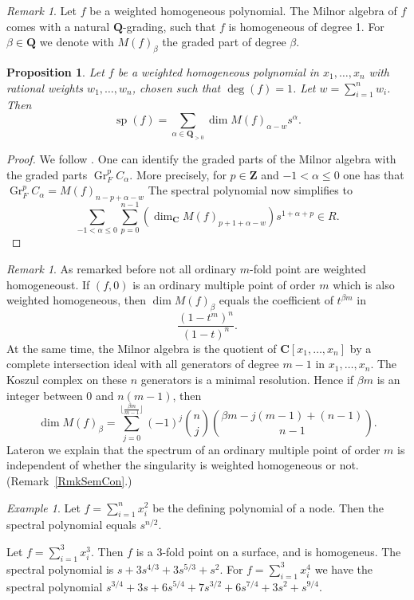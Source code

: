 \documentclass{amsart}
\newcommand{\C}{\mathbf{C}}
\newcommand{\Q}{\mathbf{Q}}
\newcommand{\Z}{\mathbf{Z}}
\newtheorem{proposition}[lemma]{Proposition}
\theoremstyle{definition}
\theoremstyle{remark}
\newtheorem{remark}[lemma]{Remark}
\newtheorem{example}[lemma]{Example}
\DeclareMathOperator{\Gr}{Gr}
\DeclareMathOperator{\spe}{sp}
\begin{document}
\begin{remark}
Let $f$ be a weighted homogeneous polynomial. The Milnor algebra of $f$ comes with a natural $\Q$-grading,  such that $f$ is homogeneous of degree 1.  For $\beta\in \Q$ we denote with $M(f)_{\beta}$ the graded part of degree $\beta$.
\end{remark}

\begin{proposition} Let $f$ be a weighted homogeneous polynomial in $x_1,\dots,x_n$ with rational weights $w_1,\dots,w_n$, chosen such that $\deg(f)=1$. Let $w=\sum_{i=1}^n w_i$. Then
\[ \spe(f)=\sum_{\alpha\in \Q_{>0}} \dim M(f)_{\alpha-w} s^{\alpha}.\]
\end{proposition}

\begin{proof}
We follow \cite[Section II.8.4]{Kuli}. One can identify the graded parts of the Milnor algebra with the graded parts $\Gr_F^p C_{\alpha}$. More precisely, for $p\in \Z$ and $-1<\alpha \leq 0$ one has that $\Gr_F^p C_{\alpha}=M(f)_{n-p+\alpha-w}$
The spectral polynomial now simplifies to
\[  \sum_{-1<\alpha\leq 0}\sum_{p=0}^{n-1} \left(\dim_{\C} M(f)_{p+1+\alpha-w}\right) s^{1+\alpha+p} \in R.\]
\end{proof}

\begin{remark} As remarked before not all ordinary $m$-fold point are weighted homogeneoust. 
If $(f,0)$ is an ordinary multiple point of order $m$ which is also weighted homogeneous, then  $\dim M(f)_{\beta}$ equals the coefficient of $t^{\beta m}$ in
\[ \frac{(1-t^m)^n}{(1-t)^n}.\]
At the same time, the Milnor algebra is the quotient of $\C[x_1,\dots,x_n]$ by a complete intersection ideal with all generators of  degree $m-1$ in $x_1,\dots,x_n$. The Koszul complex on these $n$ generators is a minimal resolution. Hence if $\beta m$ is an integer between $0$ and $n(m-1)$, then 
\[ \dim M(f)_{\beta}=\sum_{j=0}^{\lfloor \frac{\beta m}{m-1} \rfloor} (-1)^j \binom{n}{j} \binom{ \beta m -j(m-1)+(n-1)}{n-1}.\]
Lateron we explain that the spectrum of an ordinary multiple point of order $m$ is independent of whether the singularity is  weighted homogeneous or not. (Remark~\ref{RmkSemCon}.)
\end{remark}

\begin{example}
Let $f=\sum_{i=1}^n x_i^2$ be the defining polynomial of a node. Then the spectral polynomial equals $s^{n/2}$.

Let  $f=\sum_{i=1}^3 x_i^3$. Then $f$ is a 3-fold point on a surface, and is homogeneus. The spectral polynomial is $s+3s^{4/3}+3s^{5/3}+s^2$.  For $f=\sum_{i=1}^3 x_i^4$
we have  the spectral polynomial $s^{3/4}+3s+6 s^{5/4}+ 7 s^{3/2}+6 s^{7/4}+3s^2+s^{9/4}$.
\end{example}
\end{document}
